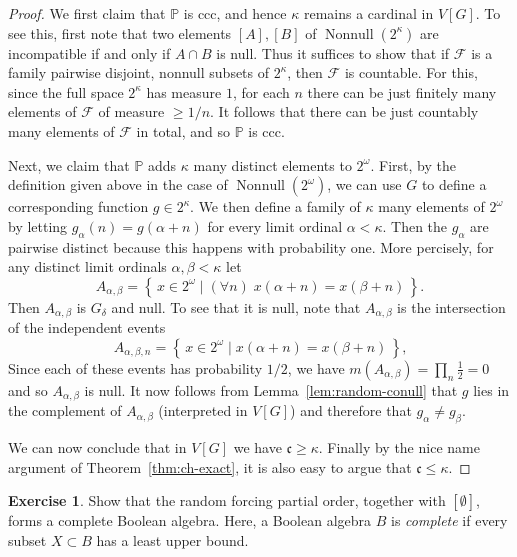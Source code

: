 \documentclass[11pt,oneside]{amsbook}
\newcommand{\set}[1]{\left\{\,#1\,\right\}}
\newcommand{\PP}{\mathbb P}
\DeclareMathOperator{\Nonnull}{Nonnull}
\theoremstyle{definition}
\newtheorem{exerc}{Exercise}[section]
\theoremstyle{plain}
\theoremstyle{definition}
\theoremstyle{remark}
\numberwithin{equation}{section}
\numberwithin{figure}{section}
\begin{document}
\begin{proof}
  We first claim that $\PP$ is ccc, and hence $\kappa$ remains a cardinal in $V[G]$. To see this, first note that two elements $[A],[B]$ of $\Nonnull(2^\kappa)$ are incompatible if and only if $A\cap B$ is null. Thus it suffices to show that if $\mathcal F$ is a family pairwise disjoint, nonnull subsets of $2^\kappa$, then $\mathcal F$ is countable. For this, since the full space $2^\kappa$ has measure $1$, for each $n$ there can be just finitely many elements of $\mathcal F$ of measure $\geq1/n$. It follows that there can be just countably many elements of $\mathcal F$ in total, and so $\PP$ is ccc.

  Next, we claim that $\PP$ adds $\kappa$ many distinct elements to $2^\omega$. First, by the definition given above in the case of $\Nonnull(2^\omega)$, we can use $G$ to define a corresponding function $g\in2^\kappa$. We then define a family of $\kappa$ many elements of $2^\omega$ by letting $g_\alpha(n)=g(\alpha+n)$ for every limit ordinal $\alpha<\kappa$. Then the $g_\alpha$ are pairwise distinct because this happens with probability one. More percisely, for any distinct limit ordinals $\alpha,\beta<\kappa$ let
  \[A_{\alpha,\beta}=\set{x\in2^\omega\mid(\forall n)\;x(\alpha+n)=x(\beta+n)}\text{.}
  \]
  Then $A_{\alpha,\beta}$ is $G_\delta$ and null. To see that it is null, note that $A_{\alpha,\beta}$ is the intersection of the independent events
  \[A_{\alpha,\beta,n}=\set{x\in2^\omega\mid x(\alpha+n)=x(\beta+n)}\text{,}
  \]
  Since each of these events has probability $1/2$, we have $m(A_{\alpha,\beta})=\prod_n\frac12=0$ and so $A_{\alpha,\beta}$ is null. It now follows from Lemma~\ref{lem:random-conull} that $g$ lies in the complement of $A_{\alpha,\beta}$ (interpreted in $V[G]$) and therefore that $g_\alpha\neq g_\beta$.

  We can now conclude that in $V[G]$ we have $\mathfrak c\geq\kappa$. Finally by the nice name argument of Theorem~\ref{thm:ch-exact}, it is also easy to argue that $\mathfrak c\leq\kappa$.
\end{proof}

\begin{exerc}
  Show that the random forcing partial order, together with $[\emptyset]$, forms a complete Boolean algebra. Here, a Boolean algebra $B$ is \emph{complete} if every subset $X\subset B$ has a least upper bound.
\end{exerc}


\end{document}
